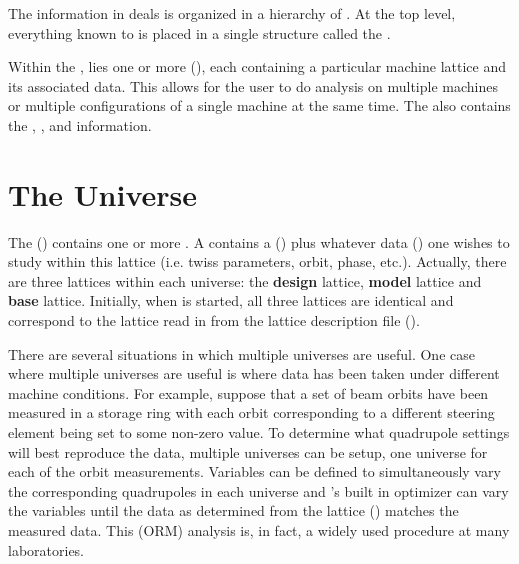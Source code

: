 The information in \tao deals is organized in a hierarchy of . At the top level,
everything known to \tao is placed in a single structure called the .

Within the , lies one or more  (), each
 containing a particular machine lattice and its associated data. This allows for the
user to do analysis on multiple machines or multiple configurations of a single machine at the same
time. The  also contains the , , and  information.

\section{The Universe}
\label{s:universe}

The \tao {} () contains one or more .  A
 contains a  () plus whatever data () one
wishes to study within this lattice (i.e. twiss parameters, orbit, phase, etc.). Actually, there are
three lattices within each universe: the \textbf{design} lattice, \textbf{model} lattice and
\textbf{base} lattice. Initially, when \tao is started, all three lattices are identical and
correspond to the lattice read in from the lattice description file ().

There are several situations in which multiple universes are useful. One case where multiple
universes are useful is where data has been taken under different machine conditions. For example,
suppose that a set of beam orbits have been measured in a storage ring with each orbit corresponding
to a different steering element being set to some non-zero value. To determine what quadrupole
settings will best reproduce the data, multiple universes can be setup, one universe for each of the
orbit measurements. Variables can be defined to simultaneously vary the corresponding quadrupoles in
each universe and \tao's built in optimizer can vary the variables until the data as determined from
the  lattice () matches the measured data. This 
(ORM) analysis is, in fact, a widely used procedure at many laboratories.

